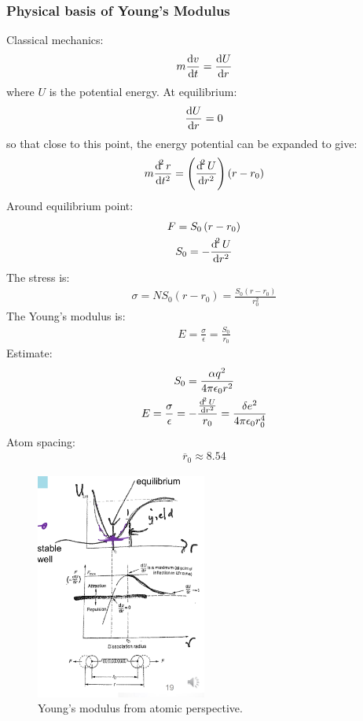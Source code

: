 \subsubsection{Physical basis of Young's Modulus}
Classical mechanics:
\begin{gather}
	m\frac{\dif v}{\dif t} = \frac{\dif U }{\dif r}
\end{gather}
where $U$ is the potential energy. At equilibrium:
\begin{gather}
	\frac{\dif U}{\dif r } = 0
\end{gather}
so that close to this point, the energy potential can be expanded to give:
\begin{gather}
	m \frac{\dif^2 r }{\dif t^2} = \left(\frac{\dif^2 U}{\dif r^2}\right)\left(r-r_0\right)
\end{gather}
Around equilibrium point:
\begin{gather}
	F = S_0 \left(r - r_0\right)\\
	S_0 = -\frac{\dif^2 U}{\dif r^2}
\end{gather}
The stress is:
\begin{gather}
	\sigma = N S_0 \left(r - r_0\right) = \frac{S_0\left(r-r_0\right)}{r_0^2}
\end{gather}
The Young's modulus is:
\begin{gather}
	E = \frac{\sigma}{\epsilon} = \frac{S_0}{r_0}
\end{gather}
Estimate:
\begin{gather}
	S_0 = \frac{\alpha q^2}{4\pi\epsilon_0r^2}\\
	E = \frac{\sigma}{\epsilon} = - \frac{\frac{\dif^2 U}{\dif r^2}}{r_0} = \frac{\delta e^2}{4\pi\epsilon_0r_0^4}
\end{gather}
Atom spacing:
\begin{gather}
	\overline{r}_0 \approx 8.54
\end{gather}
\begin{figure}[H]
	\centering
	\includegraphics[width = 0.5\textwidth]{./img/figure12.png}
	\caption{Young's modulus from atomic perspective.}
\end{figure}
